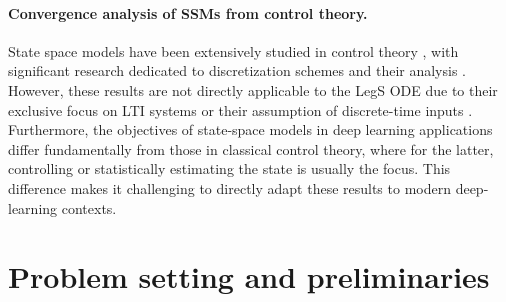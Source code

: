 \documentclass{article}
\theoremstyle{definition}
\begin{document}
\paragraph{Convergence analysis of SSMs from control theory.}
State space models have been extensively studied in control theory \citep{kalman1960new, zabczyk2020mathematical}, with significant research dedicated to discretization schemes and their analysis \citep{kowalczuk1991discretization}. However, these results are not directly applicable to the LegS ODE due to their exclusive focus on LTI systems \citep{karampetakis2014error} or their assumption of discrete-time inputs \citep{meena2020discretization}. Furthermore, the objectives of state-space models in deep learning applications differ fundamentally from those in classical control theory, where for the latter, controlling or statistically estimating the state is usually the focus. This difference makes it challenging to directly adapt these results to modern deep-learning contexts.





\section{Problem setting and preliminaries} \label{sec:problem setting}
\end{document}
